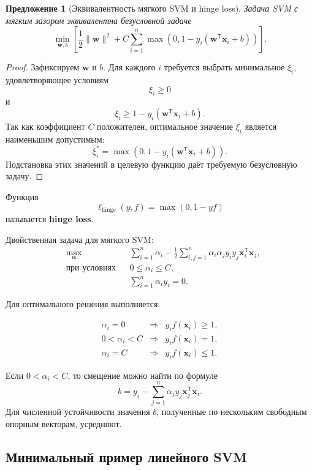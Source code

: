 \documentclass[12pt,a4paper]{article}
\newtheorem{proposition}[theorem]{Предложение}
\theoremstyle{definition}
\newcommand{\T}{\mathsf{T}}
\newcommand{\1}{\mathbf{1}}
\begin{document}
\begin{proposition}[Эквивалентность мягкого SVM и hinge loss]
Задача SVM с мягким зазором эквивалентна безусловной задаче
\[
    \min_{\bm{w},b}
    \left[
        \frac{1}{2}\|\bm{w}\|^2
        +
        C\sum_{i=1}^{n}
        \max\left(
            0,
            1-y_i(\bm{w}^{\T}\bm{x}_i+b)
        \right)
    \right].
\]
\end{proposition}

\begin{proof}
Зафиксируем $\bm{w}$ и $b$. Для каждого $i$ требуется выбрать
минимальное $\xi_i$, удовлетворяющее условиям
\[
    \xi_i\geq0
\]
и
\[
    \xi_i
    \geq
    1-y_i(\bm{w}^{\T}\bm{x}_i+b).
\]
Так как коэффициент $C$ положителен, оптимальное значение $\xi_i$
является наименьшим допустимым:
\[
    \xi_i^{*}
    =
    \max\left(
        0,
        1-y_i(\bm{w}^{\T}\bm{x}_i+b)
    \right).
\]
Подстановка этих значений в целевую функцию даёт требуемую
безусловную задачу.
\end{proof}

Функция
\[
    \ell_{\mathrm{hinge}}(y,f)
    =
    \max(0,1-yf)
\]
называется \textbf{hinge loss}.

Двойственная задача для мягкого SVM:
\[
\boxed{
\begin{aligned}
    &\max_{\bm{\alpha}}
    &&
    \sum_{i=1}^{n}\alpha_i
    -
    \frac{1}{2}
    \sum_{i,j=1}^{n}
    \alpha_i\alpha_jy_iy_j
    \bm{x}_i^{\T}\bm{x}_j,\\
    &\text{при условиях}
    &&
    0\leq\alpha_i\leq C,\\
    &&
    &\sum_{i=1}^{n}\alpha_i y_i=0.
\end{aligned}
}
\]

Для оптимального решения выполняется:

\[
\begin{array}{lll}
    \alpha_i=0
    &\Longrightarrow&
    y_if(\bm{x}_i)\geq1,\\[2mm]
    0<\alpha_i<C
    &\Longrightarrow&
    y_if(\bm{x}_i)=1,\\[2mm]
    \alpha_i=C
    &\Longrightarrow&
    y_if(\bm{x}_i)\leq1.
\end{array}
\]

Если $0<\alpha_i<C$, то смещение можно найти по формуле
\[
    b
    =
    y_i
    -
    \sum_{j=1}^{n}
    \alpha_jy_j\bm{x}_j^{\T}\bm{x}_i.
\]
Для численной устойчивости значения $b$, полученные по нескольким
свободным опорным векторам, усредняют.

\subsection{Минимальный пример линейного SVM}
\end{document}

